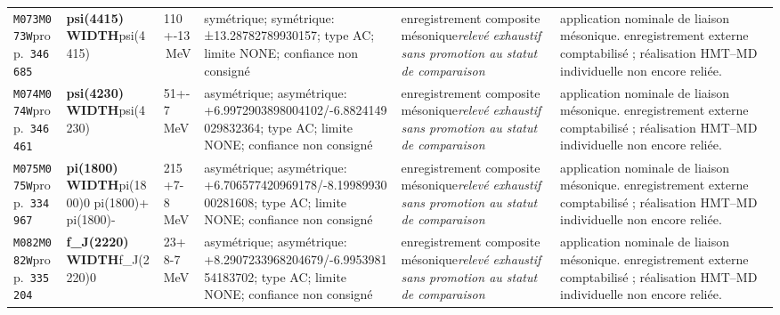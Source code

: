 \begin{landscape}
\begin{longtable}{L{1.85cm}L{4.45cm}L{2.35cm}L{4.05cm}L{3.35cm}L{7.15cm}}
\texttt{M073}\newline \texttt{M073W}\newline prop.\ \texttt{346685} & \textbf{psi(4415) WIDTH}\newline psi(4415) & 110+-13\,MeV & symétrique; symétrique: ±13.28782789930157; type AC; limite NONE; confiance non consigné & enregistrement composite mésonique\newline \emph{relevé exhaustif sans promotion au statut de comparaison} & application nominale de liaison mésonique. enregistrement externe comptabilisé ; réalisation HMT--MD individuelle non encore reliée. \\
\texttt{M074}\newline \texttt{M074W}\newline prop.\ \texttt{346461} & \textbf{psi(4230) WIDTH}\newline psi(4230) & 51+-7\,MeV & asymétrique; asymétrique: +6.9972903898004102/-6.8824149029832364; type AC; limite NONE; confiance non consigné & enregistrement composite mésonique\newline \emph{relevé exhaustif sans promotion au statut de comparaison} & application nominale de liaison mésonique. enregistrement externe comptabilisé ; réalisation HMT--MD individuelle non encore reliée. \\
\texttt{M075}\newline \texttt{M075W}\newline prop.\ \texttt{334967} & \textbf{pi(1800) WIDTH}\newline pi(1800)0 \textbar{}\allowbreak{} pi(1800)+ \textbar{}\allowbreak{} pi(1800)- & 215+7-8\,MeV & asymétrique; asymétrique: +6.706577420969178/-8.1998993000281608; type AC; limite NONE; confiance non consigné & enregistrement composite mésonique\newline \emph{relevé exhaustif sans promotion au statut de comparaison} & application nominale de liaison mésonique. enregistrement externe comptabilisé ; réalisation HMT--MD individuelle non encore reliée. \\
\texttt{M082}\newline \texttt{M082W}\newline prop.\ \texttt{335204} & \textbf{f\_\allowbreak{}J(2220) WIDTH}\newline f\_\allowbreak{}J(2220)0 & 23+8-7\,MeV & asymétrique; asymétrique: +8.2907233968204679/-6.995398154183702; type AC; limite NONE; confiance non consigné & enregistrement composite mésonique\newline \emph{relevé exhaustif sans promotion au statut de comparaison} & application nominale de liaison mésonique. enregistrement externe comptabilisé ; réalisation HMT--MD individuelle non encore reliée. \\

\end{longtable}
\end{landscape}
